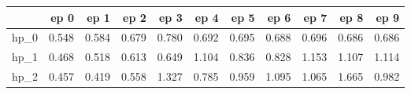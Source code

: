 \begin{tabular}{lrrrrrrrrrr}
\toprule
{} &   ep 0 &   ep 1 &   ep 2 &   ep 3 &   ep 4 &   ep 5 &   ep 6 &   ep 7 &   ep 8 &   ep 9 \\
\midrule
hp\_0 &  0.548 &  0.584 &  0.679 &  0.780 &  0.692 &  0.695 &  0.688 &  0.696 &  0.686 &  0.686 \\
hp\_1 &  0.468 &  0.518 &  0.613 &  0.649 &  1.104 &  0.836 &  0.828 &  1.153 &  1.107 &  1.114 \\
hp\_2 &  0.457 &  0.419 &  0.558 &  1.327 &  0.785 &  0.959 &  1.095 &  1.065 &  1.665 &  0.982 \\
\bottomrule
\end{tabular}
